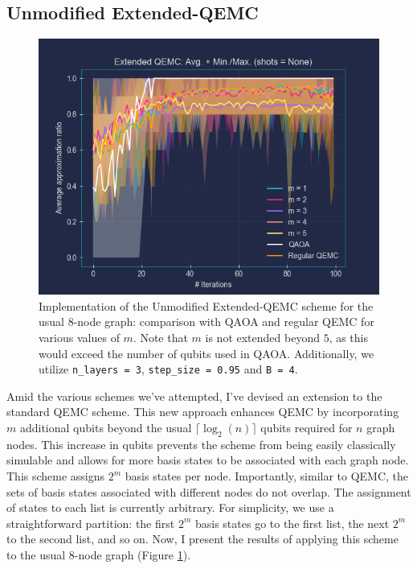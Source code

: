 \subsection{Unmodified Extended-QEMC}
\label{subsection:Vanilla_Extended_QEMC}

\begin{figure}[H]
    \centering
    \includegraphics[width=0.95\columnwidth]{Figures/Extended-QEMC/8-node(n_layers=3, step_size=0.95, m=All).png}
    \caption{Implementation of the Unmodified Extended-QEMC scheme for the usual $8$-node graph: comparison with QAOA and regular QEMC for various values of $m$. Note that $m$ is not extended beyond $5$, as this would exceed the number of qubits used in QAOA. Additionally, we utilize \texttt{n\_layers = 3}, \texttt{step\_size = 0.95} and \texttt{B = 4}.}
    \label{fig:Vanilla_Extended-QEMC}
\end{figure}

\vspace*{-2.5mm}

Amid the various schemes we've attempted, I've devised an extension to the standard QEMC scheme. This new approach enhances QEMC by incorporating $m$ additional qubits beyond the usual $\lceil\log_2(n)\rceil$ qubits required for $n$ graph nodes. This increase in qubits prevents the scheme from being easily classically simulable and allows for more basis states to be associated with each graph node. This scheme assigns $2^m$ basis states per node. Importantly, similar to QEMC, the sets of basis states associated with different nodes do not overlap. The assignment of states to each list is currently arbitrary. For simplicity, we use a straightforward partition: the first $2^m$ basis states go to the first list, the next $2^m$ to the second list, and so on. Now, I present the results of applying this scheme to the usual $8$-node graph (Figure \ref{fig:Vanilla_Extended-QEMC}).

